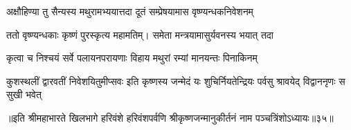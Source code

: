 \twolineshloka
{अक्षौहिण्या तु सैन्यस्य मथुरामभ्ययात्तदा}
{दूतं सम्प्रेषयामास वृष्ण्यन्धकनिवेशनम्} %

\twolineshloka
{ततो वृष्ण्यन्धकाः कृष्णं पुरस्कृत्य महामतिम्।}
{समेता मन्त्रयामासुर्यवनस्य भयात् तदा} %

\twolineshloka
{कृत्वा च निश्चयं सर्वे पलायनपरायणाः}
{विहाय मथुरां रम्यां मानयन्तः पिनाकिनम्} %

\threelineshloka
{कुशस्थलीं द्वारवतीं निवेशयितुमीप्सवः}
{इति कृष्णस्य जन्मेदं यः शुचिर्नियतेन्द्रियः}
{पर्वसु श्रावयेद् विद्वाननृणः स सुखी भवेत्} %

॥इति श्रीमहाभारते खिलभागे हरिवंशे हरिवंशपर्वणि श्रीकृष्णजन्मानुकीर्तनं नाम पञ्चत्रिंशोऽध्यायः॥३५॥